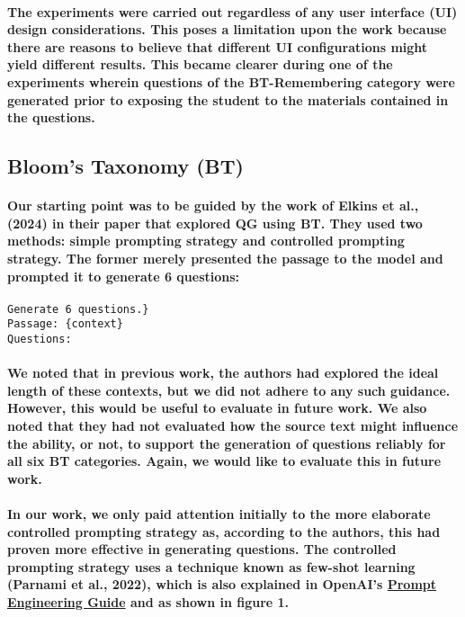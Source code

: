 \documentclass{article}
\begin{document}
\paragraph{The experiments were carried out regardless of any user interface (UI) design considerations. This poses a limitation upon the work because there are reasons to believe that different UI configurations might yield different results. This became clearer during one of the experiments wherein questions of the BT-Remembering category were generated prior to exposing the student to the materials contained in the questions.}


\subsection*{Bloom’s Taxonomy (BT)}

\paragraph{Our starting point was to be guided by the work of Elkins et al., (2024) in their paper that explored QG using BT. They used two methods: simple prompting strategy and controlled prompting strategy. The former merely presented the passage to the model and prompted it to generate 6 questions:}

\begin{verbatim}
Generate 6 questions.}
Passage: {context}
Questions:
\end{verbatim}


\paragraph{We noted that in previous work, the authors had explored the ideal length of these contexts, but we did not adhere to any such guidance. However, this would be useful to evaluate in future work. We also noted that they had not evaluated how the source text might influence the ability, or not, to support the generation of questions reliably for all six BT categories. Again, we would like to evaluate this in future work.}

\paragraph{In our work, we only paid attention initially to the more elaborate controlled prompting strategy as, according to the authors, this had proven more effective in generating questions. The controlled prompting strategy uses a technique known as few-shot learning (Parnami et al., 2022), which is also explained in OpenAI’s \href{https://platform.openai.com/docs/guides/prompt-engineering/strategy-give-models-time-to-think/}{Prompt Engineering Guide} and as shown in figure 1.}
\end{document}
